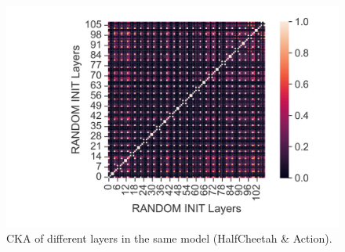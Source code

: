 \documentclass{article}
\begin{document}
\begin{figure}[H]
\begin{minipage}[b]{0.32\linewidth}
        \includegraphics[width=\linewidth]{figs/cka_40_40_dtdt_halfcheetah_medium_666_action.png}
    \end{minipage}
    \caption{CKA of different layers in the same model (HalfCheetah \& Action).}
\end{figure}
\end{document}
